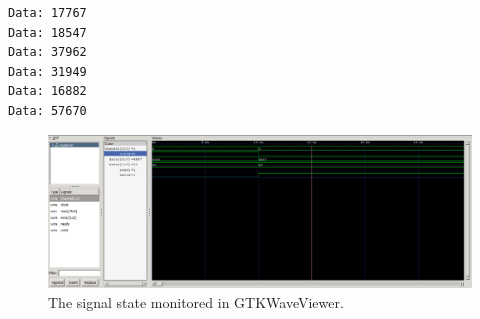 \begin{lstlisting}[caption=Output at the sink., frame=single, captionpos=b, label={lst:sinkoutput}]
Data: 17767
Data: 18547
Data: 37962
Data: 31949
Data: 16882
Data: 57670
\end{lstlisting}

\begin{figure}[h]
	\centering
	\includegraphics[width=1\linewidth]{MasterSlaveSTGTKWave.png}
	\caption{The signal state monitored in GTKWaveViewer.}
	\label{fig:gtkwavesignalstate}
\end{figure}